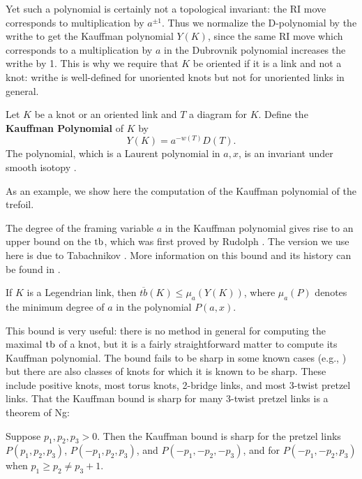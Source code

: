 Yet such a polynomial is certainly not a topological invariant: the RI move corresponds to multiplication by $a^{\pm 1}$. Thus we normalize the D-polynomial by the writhe to get the Kauffman polynomial $Y(K)$, since the same RI move which corresponds to a multiplication by $a$ in the Dubrovnik polynomial increases the writhe by 1. This is why we require that $K$ be oriented if it is a link and not a knot: writhe is well-defined for unoriented knots but not for unoriented links in general.
\begin{definition}
    Let $K$ be a knot or an oriented link and $T$ a diagram for $K$. Define the \textbf{Kauffman Polynomial} of $K$ by
    \[
        Y(K) = a^{-w(T)} D(T).
    \]
    The polynomial, which is a Laurent polynomial in $a, x$, is an invariant under smooth isotopy \cite{kauffman}.
\end{definition}

As an example, we show here the computation of the Kauffman polynomial of the trefoil.

The degree of the framing variable $a$ in the Kauffman polynomial gives rise to an upper bound on the $\operatorname{tb}$, which was first proved by Rudolph \cite{rudolph}. The version we use here is due to Tabachnikov \cite{tabachnikov}. More information on this bound and its history can be found in \cite{ferrand}.

\begin{theorem}\label{kauffman-bound}
    If $K$ is a Legendrian link, then $\overline{tb}(K) \leq \mu_a(Y(K))$, where $\mu_a(P)$ denotes the minimum degree of $a$ in the polynomial $P(a, x)$.
\end{theorem}

This bound is very useful: there is no method in general for computing the maximal $\operatorname{tb}$ of a knot, but it is a fairly straightforward matter to compute its Kauffman polynomial. The bound fails to be sharp in some known cases (e.g., \cite{ferrand}) but there are also classes of knots for which it is known to be sharp. These include positive knots, most torus knots, 2-bridge links, and most 3-twist pretzel links. That the Kauffman bound is sharp for many 3-twist pretzel links is a theorem of Ng:

\begin{theorem}[\cite{ng}]
    Suppose $p_1, p_2, p_3 > 0$. Then the Kauffman bound is sharp for the pretzel links $P(p_1, p_2, p_3)$, $P(-p_1, p_2, p_3)$, and $P(-p_1, -p_2, -p_3)$, and for $P(-p_1, -p_2, p_3)$ when $p_1 \geq p_2 \neq p_3 + 1$.
\end{theorem}

